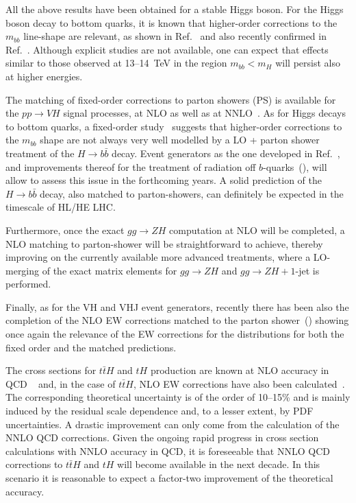 All the above results have been obtained for a stable Higgs boson. For
the Higgs boson decay to bottom quarks, it is known that higher-order
corrections to the $m_{bb}$ line-shape are relevant, as shown in
Ref.~\cite{Ferrera:2017zex} and also recently confirmed
in Ref.~\cite{Caola:2017xuq}.  Although explicit studies are not available,
one can expect that effects similar to those observed at 13--14~TeV in
the region $m_{bb}<m_H$ will persist also at higher energies.

The matching of fixed-order corrections to parton showers (PS) is
available for the $pp\rightarrow VH$ signal processes, at NLO as well
as at NNLO~\cite{Astill:2016hpa,Astill:2018ivh}.
As for Higgs decays to bottom quarks, a fixed-order study~\cite{Caola:2017xuq}
suggests that higher-order corrections to the $m_{bb}$ shape are not always
very well modelled by a LO + parton shower treatment of the $H\to b\bar{b}$ decay.
Event generators as the one developed in Ref.~\cite{Astill:2018ivh}, and improvements thereof
for the treatment of radiation off $b$-quarks~(\cite{Buonocore:2017lry}),
will allow to assess this issue in the forthcoming
years. A solid prediction of the $H\to b\bar{b}$ decay, also matched to
parton-showers, can definitely be expected in the timescale of HL/HE LHC.

Furthermore, once the exact $gg\rightarrow ZH$ computation at NLO will
be completed, a NLO matching to parton-shower will be straightforward
to achieve, thereby improving on the currently available more advanced
treatments, where a LO-merging of the exact matrix elements for
$gg\rightarrow ZH$ and $gg\rightarrow ZH+1$-jet is performed.

Finally, as for the VH and VHJ event generators, recently there has been
also the completion of the NLO EW corrections matched to the parton
shower~(\cite{Granata:2017iod}) showing once again the relevance of the
EW corrections for the distributions for both the fixed order and the
matched predictions.

 

\label{sec:hl-lhc-ttH}
The cross sections for $t\bar t H$ and $tH$ production are known at NLO accuracy in QCD ~\cite{Beenakker:2001rj,Reina:2001sf,Biswas:2012bd} and, in the
case of $t \bar t H$, NLO EW corrections have also been calculated~\cite{Yu:2014cka,Frixione:2014qaa}. The corresponding
theoretical uncertainty is of the order of 10--15\% and is mainly induced by the
residual scale dependence and, to a lesser extent, by PDF uncertainties. A
drastic improvement can only come from the calculation of the NNLO QCD
corrections. Given the ongoing rapid progress in cross section calculations with NNLO accuracy in QCD, it is
foreseeable that NNLO QCD corrections to $t\bar t H$ and $tH$ will become available in the
next decade. In this scenario it is reasonable to expect a factor-two
improvement of the theoretical accuracy.

